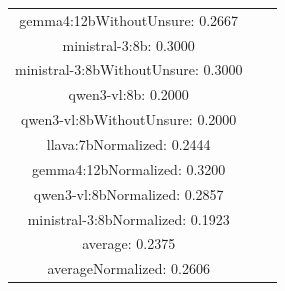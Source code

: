\documentclass[a4paper]{article}
\begin{document}
\begin{tabular}{ccc}
gemma4:12bWithoutUnsure: 0.2667 \\ ministral-3:8b: 0.3000 \\ ministral-3:8bWithoutUnsure: 0.3000 \\ qwen3-vl:8b: 0.2000 \\ qwen3-vl:8bWithoutUnsure: 0.2000 \\ llava:7bNormalized: 0.2444 \\ gemma4:12bNormalized: 0.3200 \\ qwen3-vl:8bNormalized: 0.2857 \\ ministral-3:8bNormalized: 0.1923 \\ average: 0.2375 \\ averageNormalized: 0.2606 \end{minipage}\\
\end{tabular}

\vspace{5mm}
\end{document}

